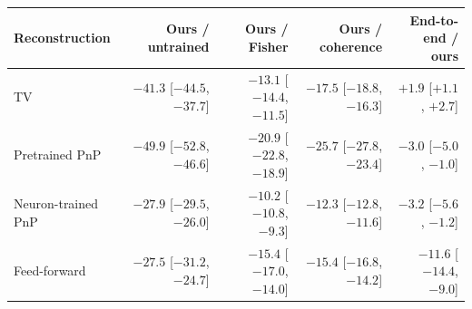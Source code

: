 \begin{tabular}{@{}lrrrr@{}}
\toprule
Reconstruction & Ours / untrained & Ours / Fisher & Ours / coherence & End-to-end / ours \\
\midrule
TV & $-41.3$ [$-44.5$, $-37.7$] & $-13.1$ [$-14.4$, $-11.5$] & $-17.5$ [$-18.8$, $-16.3$] & $+1.9$ [$+1.1$, $+2.7$] \\
Pretrained PnP & $-49.9$ [$-52.8$, $-46.6$] & $-20.9$ [$-22.8$, $-18.9$] & $-25.7$ [$-27.8$, $-23.4$] & $-3.0$ [$-5.0$, $-1.0$] \\
Neuron-trained PnP & $-27.9$ [$-29.5$, $-26.0$] & $-10.2$ [$-10.8$, $-9.3$] & $-12.3$ [$-12.8$, $-11.6$] & $-3.2$ [$-5.6$, $-1.2$] \\
Feed-forward & $-27.5$ [$-31.2$, $-24.7$] & $-15.4$ [$-17.0$, $-14.0$] & $-15.4$ [$-16.8$, $-14.2$] & $-11.6$ [$-14.4$, $-9.0$] \\
\bottomrule
\end{tabular}
